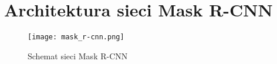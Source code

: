 \section{Architektura sieci Mask R-CNN}

\begin{figure}[H]
  \centering
  \caption{Schemat sieci Mask R-CNN}
  \texttt{[image: mask\_r-cnn.png]}
\end{figure}
